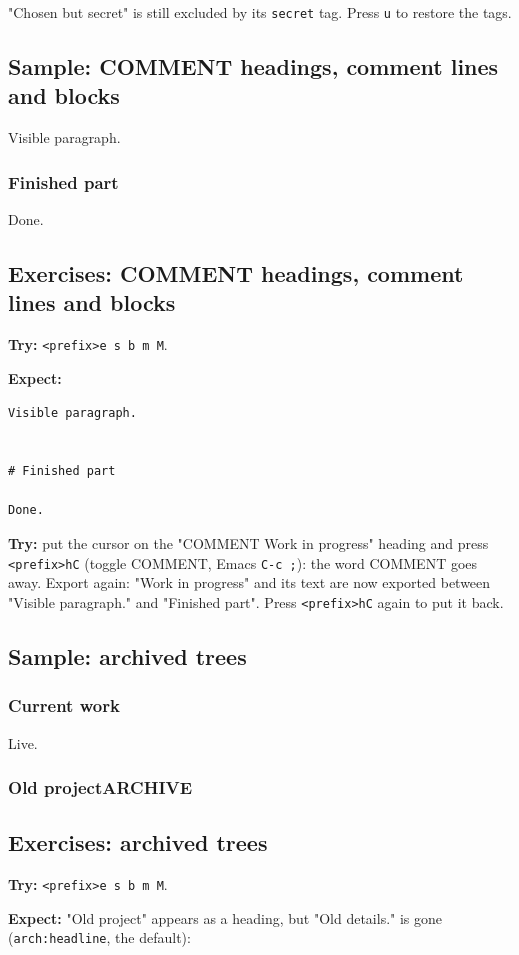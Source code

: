 "Chosen but secret" is still excluded by its \texttt{secret} tag. Press \texttt{u} to
restore the tags.
\subsection{Sample: COMMENT headings, comment lines and blocks}
\label{sec:org8581edd}
Visible paragraph.
\subsubsection{Finished part}
\label{sec:org8db22cf}
Done.
\subsection{Exercises: COMMENT headings, comment lines and blocks}
\label{sec:org4fe12a3}
\textbf{Try:} \texttt{<prefix>e s b m M}.

\textbf{Expect:}

\begin{verbatim}
Visible paragraph.


# Finished part

Done.
\end{verbatim}

\textbf{Try:} put the cursor on the "COMMENT Work in progress" heading and press
\texttt{<prefix>hC} (toggle COMMENT, Emacs \texttt{C-c ;}): the word COMMENT goes away.
Export again: "Work in progress" and its text are now exported between
"Visible paragraph." and "Finished part". Press \texttt{<prefix>hC} again to put
it back.
\subsection{Sample: archived trees}
\label{sec:org4787c0a}
\subsubsection{Current work}
\label{sec:org90ce335}
Live.
\subsubsection{Old project\hfill{}\textsc{ARCHIVE}}
\label{sec:org331091e}
\subsection{Exercises: archived trees}
\label{sec:org1af4fa9}
\textbf{Try:} \texttt{<prefix>e s b m M}.

\textbf{Expect:} "Old project" appears as a heading, but "Old details." is gone
(\texttt{arch:headline}, the default):

